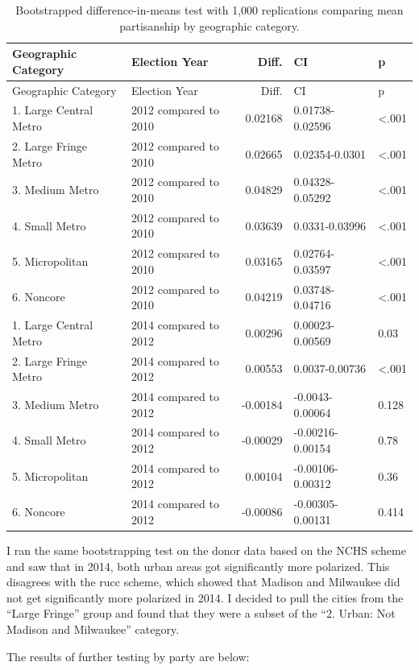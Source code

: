 \documentclass[10pt,]{article}
\begin{document}
\begin{longtable}[]{@{}llrll@{}}
\caption{Bootstrapped difference-in-means test with 1,000 replications
comparing mean partisanship by geographic category.}\tabularnewline
\toprule
Geographic Category & Election Year & Diff. & CI & p\tabularnewline
\midrule
\endfirsthead
\toprule
Geographic Category & Election Year & Diff. & CI & p\tabularnewline
\midrule
\endhead
1. Large Central Metro & 2012 compared to 2010 & 0.02168 &
0.01738-0.02596 & \textless.001\tabularnewline
2. Large Fringe Metro & 2012 compared to 2010 & 0.02665 & 0.02354-0.0301
& \textless.001\tabularnewline
3. Medium Metro & 2012 compared to 2010 & 0.04829 & 0.04328-0.05292 &
\textless.001\tabularnewline
4. Small Metro & 2012 compared to 2010 & 0.03639 & 0.0331-0.03996 &
\textless.001\tabularnewline
5. Micropolitan & 2012 compared to 2010 & 0.03165 & 0.02764-0.03597 &
\textless.001\tabularnewline
6. Noncore & 2012 compared to 2010 & 0.04219 & 0.03748-0.04716 &
\textless.001\tabularnewline
1. Large Central Metro & 2014 compared to 2012 & 0.00296 &
0.00023-0.00569 & 0.03\tabularnewline
2. Large Fringe Metro & 2014 compared to 2012 & 0.00553 & 0.0037-0.00736
& \textless.001\tabularnewline
3. Medium Metro & 2014 compared to 2012 & -0.00184 & -0.0043-0.00064 &
0.128\tabularnewline
4. Small Metro & 2014 compared to 2012 & -0.00029 & -0.00216-0.00154 &
0.78\tabularnewline
5. Micropolitan & 2014 compared to 2012 & 0.00104 & -0.00106-0.00312 &
0.36\tabularnewline
6. Noncore & 2014 compared to 2012 & -0.00086 & -0.00305-0.00131 &
0.414\tabularnewline
\bottomrule
\end{longtable}

I ran the same bootstrapping test on the donor data based on the NCHS
scheme and saw that in 2014, both urban areas got significantly more
polarized. This disagrees with the rucc scheme, which showed that
Madison and Milwaukee did not get significantly more polarized in 2014.
I decided to pull the cities from the ``Large Fringe'' group and found
that they were a subset of the ``2. Urban: Not Madison and Milwaukee''
category.

The results of further testing by party are below:
\end{document}
